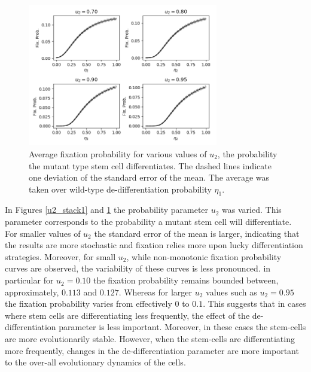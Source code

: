 \documentclass[12pt]{article}
\begin{document}
\begin{figure}[H]
\begin{center}
\includegraphics[width=0.74\textwidth]{avg_eta1_u2_stackplot3.png}
\end{center}
\caption{Average fixation probability for various values of $u_2$, the probability the mutant type stem cell differentiates. The dashed lines indicate one deviation of the standard error of the mean. The average was taken over wild-type de-differentiation probability $\eta_1$.}\label{u2_stack3}
\end{figure}

In Figures \ref{u2_stack1} and \ref{u2_stack3} the probability parameter $u_2$ was varied. This parameter corresponds to the probability a mutant stem cell will differentiate. For smaller values of $u_2$ the standard error of the mean is larger, indicating that the results are more stochastic and fixation relies more upon lucky differentiation strategies. Moreover, for small $u_2$, while non-monotonic fixation probability curves are observed, the variability of these curves is less pronounced. in particular for $u_2=0.10$ the fixation probability remains bounded between, approximately, $0.113$ and $0.127$. Whereas for larger $u_2$ values such as $u_2=0.95$ the fixation probability varies from effectively $0$ to $0.1$. This suggests that in cases where stem cells are differentiating less frequently, the effect of the de-differentiation parameter is less important. Moreover, in these cases the stem-cells are more evolutionarily stable. However, when the stem-cells are differentiating more frequently, changes in the de-differentiation parameter are more important to the over-all evolutionary dynamics of the cells.
\end{document}
